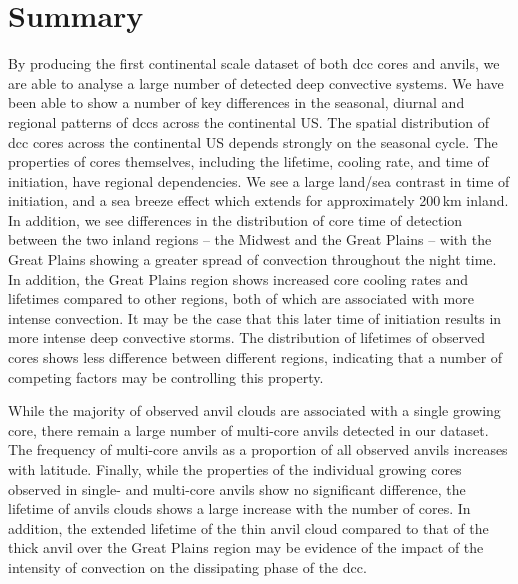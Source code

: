 

\section{Summary}  %

By producing the first continental scale dataset of both \acrshort{dcc} cores and anvils, we are able to analyse a large number of detected deep convective systems.
We have been able to show a number of key differences in the seasonal, diurnal and regional patterns of \acrshort{dcc}s across the continental US.
The spatial distribution of \acrshort{dcc} cores across the continental US depends strongly on the seasonal cycle.
The properties of cores themselves, including the lifetime, cooling rate, and time of initiation, have regional dependencies.
We see a large land/sea contrast in time of initiation, and a sea breeze effect which extends for approximately 200\,\unit{km} inland.
In addition, we see differences in the distribution of core time of detection between the two inland regions -- the Midwest and the Great Plains -- with the Great Plains showing a greater spread of convection throughout the night time.
In addition, the Great Plains region shows increased core cooling rates and lifetimes compared to other regions, both of which are associated with more intense convection.
It may be the case that this later time of initiation results in more intense deep convective storms.
The distribution of lifetimes of observed cores shows less difference between different regions, indicating that a number of competing factors may be controlling this property.

While the majority of observed anvil clouds are associated with a single growing core, there remain a large number of multi-core anvils detected in our dataset.
The frequency of multi-core anvils as a proportion of all observed anvils increases with latitude.
Finally, while the properties of the individual growing cores observed in single- and multi-core anvils show no significant difference, the lifetime of anvils clouds shows a large increase with the number of cores.
In addition, the extended lifetime of the thin anvil cloud compared to that of the thick anvil over the Great Plains region may be evidence of the impact of the intensity of convection on the dissipating phase of the \acrshort{dcc}.

